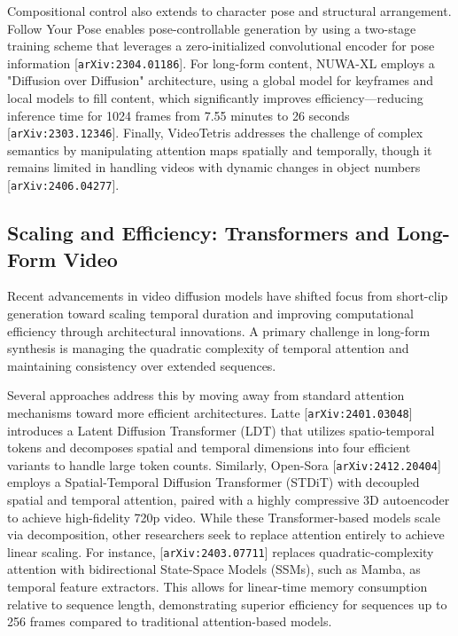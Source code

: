 \documentclass[11pt]{article}
\begin{document}
Compositional control also extends to character pose and structural arrangement. Follow Your Pose enables pose-controllable generation by using a two-stage training scheme that leverages a zero-initialized convolutional encoder for pose information [\texttt{arXiv:2304.01186}]. For long-form content, NUWA-XL employs a "Diffusion over Diffusion" architecture, using a global model for keyframes and local models to fill content, which significantly improves efficiency—reducing inference time for 1024 frames from 7.55 minutes to 26 seconds [\texttt{arXiv:2303.12346}]. Finally, VideoTetris addresses the challenge of complex semantics by manipulating attention maps spatially and temporally, though it remains limited in handling videos with dynamic changes in object numbers [\texttt{arXiv:2406.04277}].

\subsection{Scaling and Efficiency: Transformers and Long-Form Video}

Recent advancements in video diffusion models have shifted focus from short-clip generation toward scaling temporal duration and improving computational efficiency through architectural innovations. A primary challenge in long-form synthesis is managing the quadratic complexity of temporal attention and maintaining consistency over extended sequences.

Several approaches address this by moving away from standard attention mechanisms toward more efficient architectures. Latte [\texttt{arXiv:2401.03048}] introduces a Latent Diffusion Transformer (LDT) that utilizes spatio-temporal tokens and decomposes spatial and temporal dimensions into four efficient variants to handle large token counts. Similarly, Open-Sora [\texttt{arXiv:2412.20404}] employs a Spatial-Temporal Diffusion Transformer (STDiT) with decoupled spatial and temporal attention, paired with a highly compressive 3D autoencoder to achieve high-fidelity 720p video. While these Transformer-based models scale via decomposition, other researchers seek to replace attention entirely to achieve linear scaling. For instance, [\texttt{arXiv:2403.07711}] replaces quadratic-complexity attention with bidirectional State-Space Models (SSMs), such as Mamba, as temporal feature extractors. This allows for linear-time memory consumption relative to sequence length, demonstrating superior efficiency for sequences up to 256 frames compared to traditional attention-based models.
\end{document}
